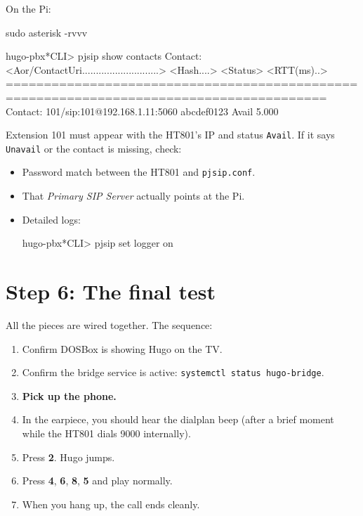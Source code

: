 On the Pi:

\begin{shellcode}
sudo asterisk -rvvv
\end{shellcode}

\begin{plaincode}
hugo-pbx*CLI> pjsip show contacts
 Contact:  <Aor/ContactUri............................>  <Hash....> <Status> <RTT(ms)..>
========================================================================================
 Contact:  101/sip:101@192.168.1.11:5060                  abcdef0123 Avail        5.000
\end{plaincode}

Extension 101 must appear with the HT801's IP and status \texttt{Avail}. If it says \texttt{Unavail} or the contact is missing, check:

\begin{itemize}
  \item Password match between the HT801 and \texttt{pjsip.conf}.
  \item That \emph{Primary SIP Server} actually points at the Pi.
  \item Detailed logs:
  \begin{shellcode}
hugo-pbx*CLI> pjsip set logger on
  \end{shellcode}
\end{itemize}

\section{Step 6: The final test}

All the pieces are wired together. The sequence:

\begin{enumerate}
  \item Confirm DOSBox is showing Hugo on the TV.
  \item Confirm the bridge service is active: \texttt{systemctl status hugo-bridge}.
  \item \textbf{Pick up the phone.}
  \item In the earpiece, you should hear the dialplan beep (after a brief moment while the HT801 dials 9000 internally).
  \item Press \textbf{2}. Hugo jumps.
  \item Press \textbf{4}, \textbf{6}, \textbf{8}, \textbf{5} and play normally.
  \item When you hang up, the call ends cleanly.
\end{enumerate}

